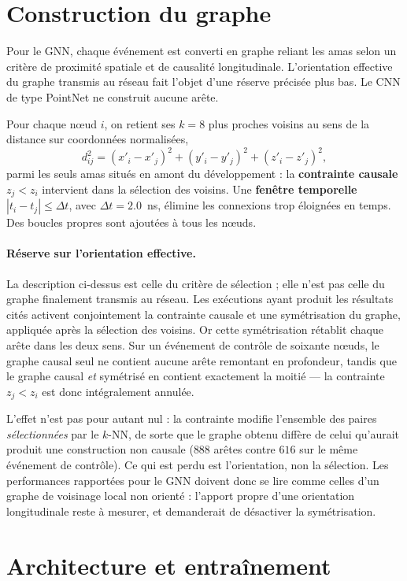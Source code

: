 \section{Construction du graphe}

Pour le GNN, chaque événement est converti en graphe reliant les amas selon un critère de proximité spatiale et de causalité longitudinale. L'orientation effective du graphe transmis au réseau fait l'objet d'une réserve précisée plus bas. Le CNN de type PointNet ne construit aucune arête.

Pour chaque nœud \(i\), on retient ses \(k = 8\) plus proches voisins au sens de la distance sur coordonnées normalisées,
\[
d_{ij}^{2} =
(x'_i-x'_j)^2 + (y'_i-y'_j)^2 + (z'_i-z'_j)^2,
\]
parmi les seuls amas situés en amont du développement : la \textbf{contrainte causale} \(z_j < z_i\) intervient dans la sélection des voisins. Une \textbf{fenêtre temporelle} \(|t_i - t_j| \leq \Delta t\), avec \(\Delta t = 2.0\)~ns, élimine les connexions trop éloignées en temps. Des boucles propres sont ajoutées à tous les nœuds.

\paragraph{Réserve sur l'orientation effective.} La description ci-dessus est celle du critère de sélection ; elle n'est pas celle du graphe finalement transmis au réseau. Les exécutions ayant produit les résultats cités activent conjointement la contrainte causale et une symétrisation du graphe, appliquée après la sélection des voisins. Or cette symétrisation rétablit chaque arête dans les deux sens. Sur un événement de contrôle de soixante nœuds, le graphe causal seul ne contient aucune arête remontant en profondeur, tandis que le graphe causal \emph{et} symétrisé en contient exactement la moitié — la contrainte \(z_j < z_i\) est donc intégralement annulée.

L'effet n'est pas pour autant nul : la contrainte modifie l'ensemble des paires \emph{sélectionnées} par le \(k\)-NN, de sorte que le graphe obtenu diffère de celui qu'aurait produit une construction non causale ($888$ arêtes contre $616$ sur le même événement de contrôle). Ce qui est perdu est l'orientation, non la sélection. Les performances rapportées pour le GNN doivent donc se lire comme celles d'un graphe de voisinage local non orienté : l'apport propre d'une orientation longitudinale reste à mesurer, et demanderait de désactiver la symétrisation.

\section{Architecture et entraînement}

